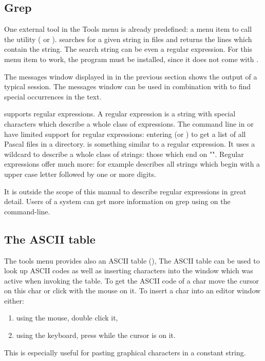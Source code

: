 \subsection{Grep}
\label{se:grep}
One external tool in the Tools menu is already predefined: a
menu item to call the  utility ( or
).  searches for a given string in files and
returns the lines which contain the string. The search string can
be even a regular expression. For this menu item to work, the
 program must be installed, since it does not come with \fpc.

The messages window displayed in  in the previous 
section shows the output of a typical  session. The messages
window can be used in combination with  to find special
occurrences in the text.

 supports regular expressions. A regular expression is a 
string with special characters which describe a whole class of 
expressions. The command line in \dos or \linux have limited 
support for regular expressions: entering  
(or ) to get a list of all Pascal files in a
directory.  is something similar to a regular expression. 
It uses a wildcard to describe a whole class of strings: those which 
end on "". 
Regular expressions offer much more: for example \var{[A-Z][0-9]+} 
describes all strings which begin with a upper case letter followed by
one or more digits.

It is outside the scope of this manual to describe regular expressions
in great detail. Users of a \linux system can get more information on grep
using  on the command-line.
%
%
\subsection{The ASCII table}
\label{se:asciitable}
The tools menu provides also an ASCII table (),
The ASCII table can be used to look up ASCII codes as well as
inserting characters into the window which was active when invoking the
table. To get the ASCII code of a char move the cursor on this char 
or click with the mouse on it. To insert a
char into an editor window either:
\begin{enumerate}
\item using the mouse, double click it,
\item using the keyboard,  press  while the cursor is on it.
\end{enumerate}
This is especially useful for pasting graphical characters in a constant
string.


